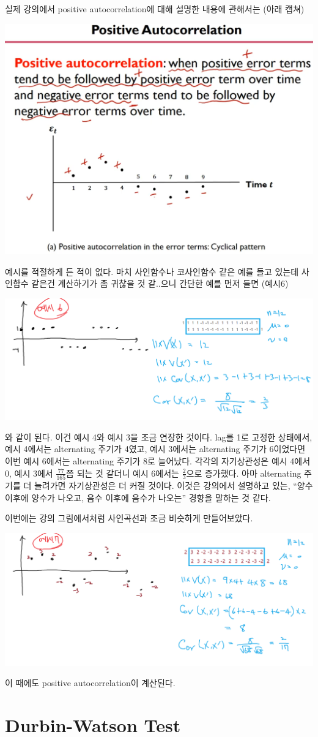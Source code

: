 \documentclass{article}
\begin{document}
실제 강의에서 positive autocorrelation에 대해 설명한 내용에 관해서는 (아래 캡쳐)
\begin{center}
\includegraphics[width=.4\textwidth]{positive_autocorrelation}
\end{center}
예시를 적절하게 든 적이 없다.
마치 사인함수나 코사인함수 같은 예를 들고 있는데 사인함수 같은건 계산하기가 좀 귀찮을 것 같..으니 간단한 예를 먼저 들면 (예시6)
\begin{center}
\includegraphics[width=.6\textwidth]{autocorrelation-4}
\end{center}
와 같이 된다.
이건 예시 4와 예시 3을 조금 연장한 것이다.
lag를 1로 고정한 상태에서, 예시 4에서는 alternating 주기가 4였고, 예시 3에서는 alternating 주기가 6이었다면 이번 예시 6에서는 alternating 주기가 8로 늘어났다.
각각의 자기상관성은 예시 4에서 0, 예시 3에서 \(\frac{77}{165}\)쯤 되는 것 같더니 예시 6에서는 \(\frac23\)으로 증가했다.
아마 alternating 주기를 더 늘려가면 자기상관성은 더 커질 것이다.
이것은 강의에서 설명하고 있는, ``양수 이후에 양수가 나오고, 음수 이후에 음수가 나오는'' 경향을 말하는 것 같다.

이번에는 강의 그림에서처럼 사인곡선과 조금 비슷하게 만들어보았다.
\begin{center}
\includegraphics[width=.6\textwidth]{autocorrelation-5}
\end{center}
이 때에도 positive autocorrelation이 계산된다.

\section{Durbin-Watson Test}
\end{document}
